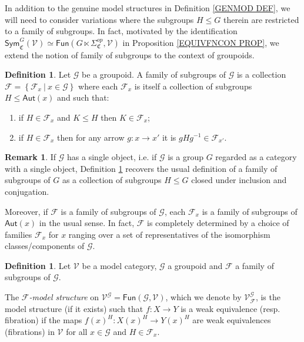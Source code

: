 \documentclass[a4paper,10pt
,draft
]{article}%
\numberwithin{equation}{section}
\numberwithin{figure}{section}
\theoremstyle{definition} %
\newtheorem{definition}[equation]{Definition}%
\newtheorem{remark}[equation]{Remark}%
\newcommand{\Fun}{\mathsf{Fun}}
\newcommand{\F}{\ensuremath{\mathcal F}}
\newcommand{\V}{\ensuremath{\mathcal V}}
\newcommand{\G}{\ensuremath{\mathcal G}}
\newcommand{\1}{\ensuremath{\mathbbm 1}}%
\begin{document}
In addition to the genuine model structures in 
Definition \ref{GENMOD DEF},
we will need to consider variations
where the subgroups $H\leq G$ therein are restricted to a family of subgroups.
In fact, motivated by the identification
$\mathsf{Sym}^G_{\mathfrak{C}}(\V) \simeq 
\mathsf{Fun}(G \ltimes \Sigma^{op}_{\mathfrak{C}},\V)$
in Proposition \ref{EQUIVFNCON PROP},
we extend the notion of family of subgroups to the context of groupoids.


\begin{definition}\label{FAMGROUPOID DEF}
Let $\G$ be a groupoid.
A family of subgroups of $\G$
is a collection 
$\mathcal{F} = \left\{\mathcal{F}_x\ | \ x\in \G\right\}$
where each $\F_x$ is itself a collection of subgroups
$H \leq \mathsf{Aut}(x)$ and such that:
\begin{enumerate}[label = (\roman*)]
\item if $H \in \F_x$ and $K \leq H$ then $K \in \mathcal{F}_x$;
\item if $H \in \mathcal{F}_x$
then for any arrow $g \colon x \to x'$
it is $g H g^{-1} \in \mathcal{F}_{x'}$.
\end{enumerate}
\end{definition}


\begin{remark}
If $\G$ has a single object, i.e. if $\G$ is a group $G$ regarded as a category with a single object, Definition \ref{FAMGROUPOID DEF} recovers the usual definition of a family of subgroups of $G$ as a collection of subgroups $H\leq G$ closed under inclusion and conjugation.

Moreover, if $\F$ is a family of subgroups of $\G$, each $\F_x$ is a family of subgroups of $\mathsf{Aut}(x)$ in the usual sense. 
In fact, $\mathcal{F}$ is completely determined by a choice of families
$\F_x$ for $x$ ranging over a set of representatives of the isomorphism classes/components of $\G$.
\end{remark}



\begin{definition}
	Let $\V$ be a model category, $\G$ a groupoid and 
	$\F$ a family of subgroups of $\G$.

	The \textit{$\F$-model structure} on $\V^\G = \Fun(\G, \V)$, 
	which we denote by $\V^\G_\F$,
	is the model structure (if it exists)
	such that 
	$f\colon X \to Y$
	is a weak equivalence (resp. fibration)
	if the maps $f(x)^H \colon X(x)^H \to Y(x)^H$ are weak equivalences (fibrations) in $\V$ for all $x \in \G$ and $H \in \F_x$.
\end{definition}
\end{document}
